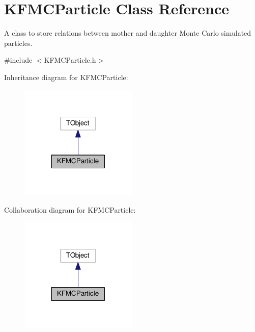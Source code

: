 \hypertarget{classKFMCParticle}{}\section{K\+F\+M\+C\+Particle Class Reference}
\label{classKFMCParticle}


A class to store relations between mother and daughter Monte Carlo simulated particles.  




{\ttfamily \#include $<$K\+F\+M\+C\+Particle.\+h$>$}



Inheritance diagram for K\+F\+M\+C\+Particle\+:
\nopagebreak
\begin{figure}[H]
\begin{center}
\leavevmode
\includegraphics[width=158pt]{classKFMCParticle__inherit__graph}
\end{center}
\end{figure}


Collaboration diagram for K\+F\+M\+C\+Particle\+:
\nopagebreak
\begin{figure}[H]
\begin{center}
\leavevmode
\includegraphics[width=158pt]{classKFMCParticle__coll__graph}
\end{center}
\end{figure}
